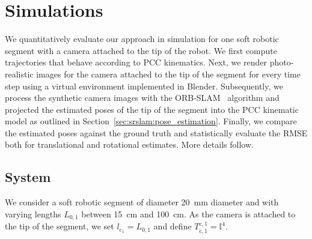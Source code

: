 \section{Simulations}
\label{sec:srslam:simulations}

We quantitatively evaluate our approach in simulation for one soft robotic segment with a camera attached to the tip of the robot. 
We first compute trajectories that behave according to \gls{PCC} kinematics. 
Next, we render photo-realistic images for the camera attached to the tip of the segment for every time step using a virtual environment implemented in Blender. Subsequently, we process the synthetic camera images with the ORB-SLAM~\cite{mur2017orb} algorithm and projected the estimated poses of the tip of the segment into the \gls{PCC} kinematic model as outlined in Section~\ref{sec:srslam:pose_estimation}. Finally, we compare the estimated poses against the ground truth and statistically evaluate the \gls{RMSE} both for translational and rotational estimates. More details follow.

\subsection{System}\label{sub:srslam:simulations_system}
We consider a soft robotic segment of diameter \SI{20}{mm} diameter and with varying lengths $L_{0,1}$ between \SI{15}{cm} and \SI{100}{cm}.
As the camera is attached to the tip of the segment, we set $l_{\mathrm{c}_1} = L_{0,1}$ and define $T_{\check{\mathrm{c}},1}^{\mathrm{c},1} = \mathbb{I}^4$.

